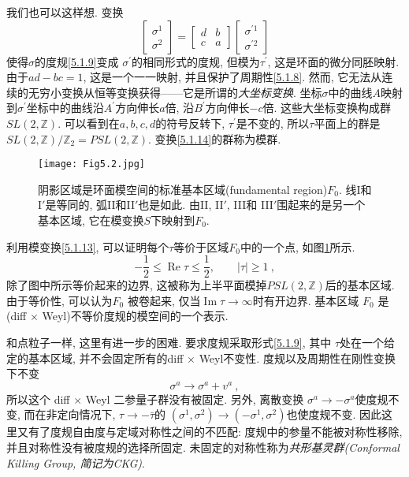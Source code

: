 我们也可以这样想. 变换
\begin{equation}
	\begin{bmatrix}
		\sigma^{1} \\
		\sigma^{2}
	\end{bmatrix}= \begin{bmatrix}
		d & b \\
		c & a
	\end{bmatrix} \begin{bmatrix}
		\sigma^{\prime 1} \\
		\sigma^{\prime 2}
	\end{bmatrix} \label{5.1.14}
\end{equation}
使得$\sigma$的度规\eqref{5.1.9}变成 $\sigma^{\prime}$的相同形式的度规, 但模为$\tau^{\prime}$, 这是环面的微分同胚映射. 由于$a d-b c=1$, 这是一个一一映射, 
并且保护了周期性\eqref{5.1.8}. 然而, 它无法从连续的无穷小变换从恒等变换获得——它是所谓的\emph{大坐标变换}. 坐标$\sigma$中的曲线$A$映射到$\sigma^{\prime}$坐标中的曲线沿$A^{\prime}$方向伸长$a$倍, 沿$B^{\prime}$方向伸长$-c$倍. 这些大坐标变换构成群$SL(2, \mathds{Z})$. 
可以看到在$a, b, c, d$的符号反转下, $\tau^{\prime}$是不变的, 所以$\tau$平面上的群是$S L(2, \mathds{Z}) / \mathds{Z}_{2}=P S L(2, \mathds{Z})$. 
变换\eqref{5.1.14}的群称为模群.

\begin{figure}
	\begin{center}
		\texttt{[image: Fig5.2.jpg]}\\
		\caption{阴影区域是环面模空间的标准基本区域(fundamental region)$F_{0}$. 线I和I$'$是等同的, 弧II和II$'$也是如此. 由II, II$'$, III和 III$'$围起来的是另一个基本区域, 它在模变换$S$下映射到$F_{0}$.}\label{fig:5.2}
	\end{center}
\end{figure}

利用模变换\eqref{5.1.13}, 可以证明每个$\tau$等价于区域$F_{0}$中的一个点, 如图\ref{fig:5.2}所示.
\begin{equation}
	-\frac{1}{2} \leq \operatorname{Re} \tau \leq \frac{1}{2}, \qquad|\tau| \geq 1 \:,\label{5.1.15}
\end{equation}
除了图中所示等价起来的边界, 这被称为上半平面模掉$PSL(2, \mathds{Z})$后的基本区域. 由于等价性, 可以认为$F_{0}$ 被卷起来, 
仅当$\operatorname{Im} \tau \rightarrow \infty$时有开边界. 基本区域 $F_{0}$ 是(diff $\times$ Weyl)不等价度规的模空间的一个表示.

和点粒子一样, 这里有进一步的困难. 要求度规采取形式\eqref{5.1.9}, 其中 $\tau$处在一个给定的基本区域, 并不会固定所有的diff $\times$ Weyl不变性. 
度规以及周期性在刚性变换下不变
\begin{equation}
	\sigma^{a} \rightarrow \sigma^{a}+v^{a} \:, \label{5.1.16}
\end{equation}
所以这个 diff $\times$ Weyl 二参量子群没有被固定. 另外, 离散变换 $\sigma^{a} \rightarrow-\sigma^{a}$使度规不变, 而在非定向情况下, $\tau \rightarrow-\bar{\tau}$的 $(\sigma^{1}, \sigma^{2}) \rightarrow (-\sigma^{1}, \sigma^{2})$也使度规不变. 因此这里又有了度规自由度与定域对称性之间的不匹配: 度规中的参量不能被对称性移除, 并且对称性没有被度规的选择所固定. 未固定的对称性称为\emph{共形基灵群(Conformal Killing Group, 简记为CKG)}.


